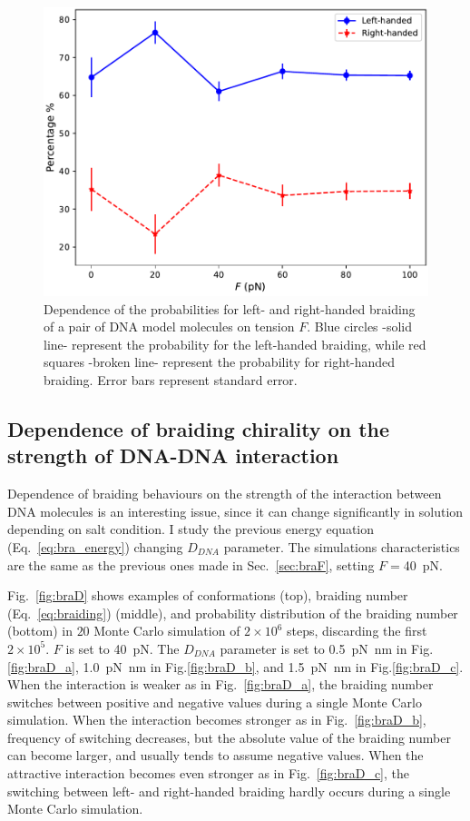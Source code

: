 \documentclass[a4paper,10pt]{article}
\begin{document}
\begin{figure}[htbp]
\centering
\includegraphics[width=.6\textwidth]{brF_br_gr.pdf}
\caption{Dependence of the probabilities for left- and right-handed braiding of a pair of DNA model molecules on tension $F$.
Blue circles -solid line- represent the probability for the left-handed braiding, while red squares -broken line- represent the probability for right-handed braiding.
Error bars represent standard error.}
\label{fig:braF_pr}
\end{figure}

\subsection{Dependence of braiding chirality on the strength of DNA-DNA interaction}
Dependence of braiding behaviours on the strength of the interaction between DNA molecules is an interesting issue, since it can change significantly in solution depending on salt condition.
I study the previous energy equation (Eq.~\ref{eq:bra_energy}) changing $D_{DNA}$ parameter.
The simulations characteristics are the same as the previous ones made in Sec.~\ref{sec:braF}, setting $F=$\SI{40}{\pico\newton}.

Fig.~\ref{fig:braD} shows examples of conformations (top), braiding number (Eq.~\ref{eq:braiding}) (middle), and probability distribution of the braiding number (bottom) in $20$ Monte Carlo simulation of $2\times 10^6$ steps, discarding the first $2\times 10^5$.
$F$ is set to \SI{40}{\pico\newton}.
The $D_{DNA}$ parameter is set to \SI{0.5}{\pico\newton\nano\meter} in Fig.\ref{fig:braD_a}, \SI{1.0}{\pico\newton\nano\meter} in Fig.\ref{fig:braD_b}, and \SI{1.5}{\pico\newton\nano\meter} in Fig.\ref{fig:braD_c}.
When the interaction is weaker as in Fig.~\ref{fig:braD_a}, the braiding number switches between positive and negative values during a single Monte Carlo simulation.
When the interaction becomes stronger as in Fig.~\ref{fig:braD_b}, frequency of switching decreases, but the absolute value of the braiding number can become larger, and usually tends to assume negative values.
When the attractive interaction becomes even stronger as in Fig.~\ref{fig:braD_c}, the switching between left- and right-handed braiding hardly occurs during a single Monte Carlo simulation.
\end{document}
